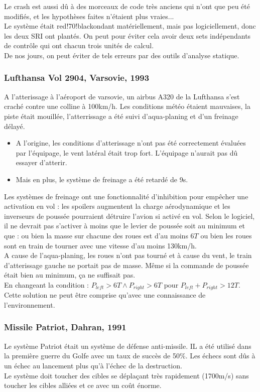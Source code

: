 \documentclass{cours}
\begin{document}
Le crash est aussi dû à des morceaux de code très anciens qui n'ont que peu été modifiés, et les hypothèses faites n'étaient plus vraies...\\
Le système était red!70!blackondant matériellement, mais pas logiciellement, donc les deux SRI ont plantés. On peut pour éviter cela avoir deux sets indépendants de contrôle qui ont chacun trois unités de calcul.\\
De nos jours, on peut éviter de tels erreurs par des outils d'analyse statique.

\subsubsection{Lufthansa Vol 2904, Varsovie, 1993}
A l'atterissage à l'aéroport de varsovie, un airbus A320 de la Lufthansa s'est craché contre une colline à 100km/h. Les conditions météo étaient mauvaises, la piste était mouillée, l'atterrissage a été suivi d'aqua-planing et d'un freinage délayé.
\begin{itemize}
	\item A l'origine, les conditions d'atterissage n'ont pas été correctement évaluées par l'équipage, le vent latéral était trop fort. L'équipage n'aurait pas dû essayer d'atterir.
	\item Mais en plus, le système de freinage a été retardé de 9s.
\end{itemize}
Les systèmes de freinage ont une fonctionnalité d'inhibition pour empêcher une activation en vol : les spoilers augmentent la charge aérodynamique et les inverseurs de poussée pourraient détruire l'avion si activé en vol.
Selon le logiciel, il ne devrait pas s'activer à moins que le levier de poussée soit au minimum et que : ou bien la masse sur chacune des roues est d'au moins $6T$ ou bien les roues sont en train de tourner avec une vitesse d'au moins 130km/h.\\

A cause de l'aqua-planing, les roues n'ont pas tourné et à cause du vent, le train d'atterissage gauche ne portait pas de masse. Même si la commande de poussée était bien au minimum, ça ne suffisait pas.\\
En changeant la condition : $P_{left} > 6T \land P_{right} > 6T$ pour $P_{left} + P_{right} > 12T$. Cette solution ne peut être comprise qu'avec une connaissance de l'environnement.

\subsubsection{Missile Patriot, Dahran, 1991}
Le système Patriot était un système de défense anti-missile. IL a été utilisé dans la première guerre du Golfe avec un taux de succès de 50\%. Les échecs sont dûs à un échec au lancement plus qu'à l'échec de la destruction.\\
Le système doit toucher des cibles se déplaçant très rapidement (1700m/s) sans toucher les cibles alliées et ce avec un coût énorme.
\end{document}
